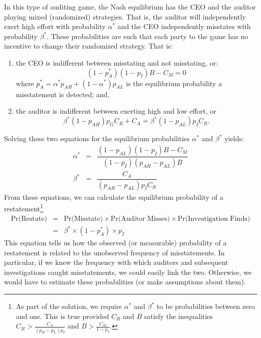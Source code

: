 In this type of auditing game, the Nash equilibrium has the CEO and the auditor playing mixed (randomized) strategies.
That is, the auditor will independently exert high effort with probability $\alpha^*$ and the CEO independently misstates with probability $\beta^*$. 
These probabilities are such that each party to the game has no incentive to change their randomized strategy. 
That is:
\begin{enumerate}
\item the CEO
is indifferent between misstating and not misstating, or:
\begin{equation}\label{manager}
(1 - p_A^*)(1 - p_I) B - C_M = 0 
\end{equation}
where $p_A^* = \alpha^* p_{AH }+ (1-\alpha^*) p_{AL}$ is the equilibrium 
probability a misstatement is detected; and,
\item the auditor is indifferent between exerting high and low effort, or
$$ \beta^* (1-p_{AH}) p_G C_R + C_A = \beta^* (1-p_{AL}) p_I C_R .$$
\end{enumerate}

Solving these two equations for the equilibrium probabilities $\alpha^*$ and $\beta^*$
yields:
\begin{equation}\label{equilstrat}
\begin{array}{lcl}
  \alpha^* &= & \dfrac{ ( 1 - p_{AL}) (1 - p_I) B- C_M}{ (1 - p_I) (p_{AH}-p_{AL}) B}\\[1.5em]
  \beta^* &= & \dfrac{C_A}{(p_{AH}-p_{AL}) p_I C_R}  
\end{array}
\end{equation}
From these equations, we can calculate the equilibrium probability of a restatement\footnote{
As part of the solution, we require $\alpha^*$ and $\beta^*$ to be probabilities between
zero and one. 
This is true provided $C_R$ and $B$ satisfy the inequalities
$ C_R > \frac{C_A}{(p_H-p_L)p_I} $
and 
$ B > \frac{C_M}{1 - p_I}  $.}
\begin{equation} \label{equilpr1}
\begin{array}{lcl}
\mbox{Pr(Restate)} & = &  \mbox{Pr(Misstate)} \times \mbox{Pr(Auditor Misses)} \times
\mbox{Pr(Investigation Finds)}\\[1em]
& = & \beta^* \times (1-p_A^*) \times p_I
\end{array}\end{equation}
This equation tells us how the observed (or measurable) probability of a restatement is related to
the unobserved frequency of misstatements. In particular, if we knew the frequency with which auditors and subsequent investigations caught misstatements, we could easily link the two. Otherwise,
we would have to estimate these probabilities (or make assumptions about them).

